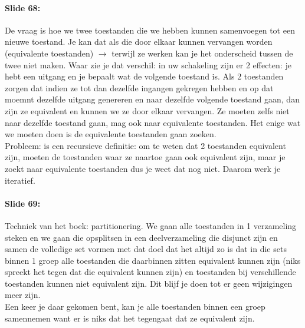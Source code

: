 \documentclass[10pt,a4paper]{book}
\begin{document}
\paragraph{Slide 68:} De vraag is hoe we twee toestanden die we hebben kunnen samenvoegen tot een nieuwe toestand. Je kan dat als die door elkaar kunnen vervangen worden (equivalente toestanden) $\rightarrow$ terwijl ze werken kan je het onderscheid tussen de twee niet maken. Waar zie je dat verschil: in uw schakeling zijn er 2 effecten: je hebt een uitgang en je bepaalt wat de volgende toestand is. Als 2 toestanden zorgen dat indien ze tot dan dezelfde ingangen gekregen hebben en op dat moemnt dezelfde uitgang genereren en naar dezelfde volgende toestand gaan, dan zijn ze equivalent en kunnen we ze door elkaar vervangen. Ze moeten zelfs niet naar dezelfde toestand gaan, mag ook naar equivalente toestanden. Het enige wat we moeten doen is de equivalente toestanden gaan zoeken.\\
Probleem: is een recursieve definitie: om te weten dat 2 toestanden equivalent zijn, moeten de toestanden waar ze naartoe gaan ook equivalent zijn, maar je zoekt naar equivalente toestanden dus je weet dat nog niet. Daarom werk je iteratief.

\paragraph{Slide 69:} Techniek van het boek: partitionering. We gaan alle toestanden in 1 verzameling steken en we gaan die opsplitsen in een deelverzameling die disjunct zijn en samen de volledige set vormen met dat doel dat het altijd zo is dat in die sets binnen 1 groep alle toestanden die daarbinnen zitten equivalent kunnen zijn (niks spreekt het tegen dat die equivalent kunnen zijn) en toestanden bij verschillende toestanden kunnen niet equivalent zijn. Dit blijf je doen tot er geen wijzigingen meer zijn.\\
Een keer je daar gekomen bent, kan je alle toestanden binnen een groep samennemen want er is niks dat het tegengaat dat ze equivalent zijn.
\end{document}
